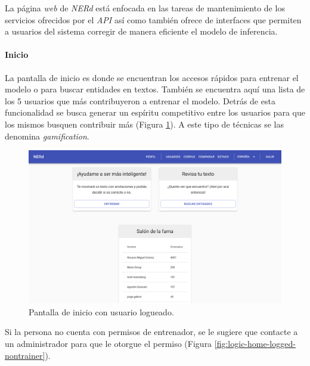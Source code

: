 \documentclass[12pt,a4paper,]{scrartcl}
\let\oldparagraph\paragraph
\renewcommand{\paragraph}[1]{\oldparagraph{#1}\mbox{}}
\begin{document}
La página \emph{web} de \emph{NERd} está enfocada en las tareas de mantenimiento de los servicios ofrecidos por el \emph{API} así como también ofrece de interfaces que permiten a usuarios del sistema corregir de manera eficiente el modelo de inferencia.

\hypertarget{inicio}{%
\paragraph{Inicio}\label{inicio}}

La pantalla de inicio es donde se encuentran los accesos rápidos para entrenar el modelo o para buscar entidades en textos.
También se encuentra aquí una lista de los 5 usuarios que más contribuyeron a entrenar el modelo. Detrás de esta funcionalidad se busca generar un espíritu competitivo entre los usuarios para que los mismos busquen contribuir más (Figura \ref{fig:logic-home}). A este tipo de técnicas se las denomina \emph{gamification}.

\begin{figure}[H]

{\centering \includegraphics{assets/logic/home-logged-all.pdf} 

}

\caption{Pantalla de inicio con usuario logueado.}\label{fig:logic-home}
\end{figure}

Si la persona no cuenta con permisos de entrenador, se le sugiere que contacte a un administrador para que le otorgue el permiso (Figura \ref{fig:logic-home-logged-nontrainer}).
\end{document}
